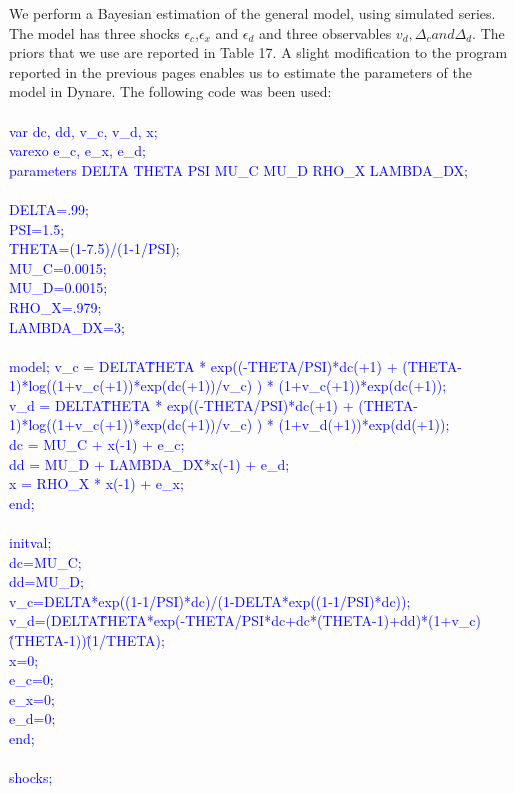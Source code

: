 \documentclass[a4paper,12pt]{scrartcl} %
\begin{document}
We perform a Bayesian estimation of the general model, using simulated series. The model has three shocks $\epsilon_c$,$\epsilon_x$ and $\epsilon_d$ and three observables $v_d, \Delta_c and \Delta_d$. The priors that we use are reported in Table 17. A slight modification to the program reported in the previous pages enables us to estimate the parameters of the model in Dynare. The following code was been used:\\
\\
\textcolor{blue}{
var  dc, dd, v\_c, v\_d, x;\\
varexo e\_c, e\_x, e\_d;
\\
parameters DELTA THETA PSI MU\_C MU\_D RHO\_X LAMBDA\_DX;\\
\\
DELTA=.99;\\
PSI=1.5;\\
THETA=(1-7.5)/(1-1/PSI);\\
MU\_C=0.0015;\\
MU\_D=0.0015;\\
RHO\_X=.979;\\
LAMBDA\_DX=3;\\
\\
model;
v\_c       = DELTA\^THETA * exp((-THETA/PSI)*dc(+1) + (THETA-1)*log((1+v\_c(+1))*exp(dc(+1))/v\_c) ) * (1+v\_c(+1))*exp(dc(+1));\\
v\_d       = DELTA\^THETA * exp((-THETA/PSI)*dc(+1) + (THETA-1)*log((1+v\_c(+1))*exp(dc(+1))/v\_c) ) * (1+v\_d(+1))*exp(dd(+1));\\
dc        = MU\_C  + x(-1) + e\_c;\\
dd        = MU\_D + LAMBDA\_DX*x(-1) + e\_d;\\
x         = RHO\_X * x(-1) + e\_x;\\
end;\\
\\
initval;\\
dc=MU\_C;\\
dd=MU\_D;\\
v\_c=DELTA*exp((1-1/PSI)*dc)/(1-DELTA*exp((1-1/PSI)*dc));\\
v\_d=(DELTA\^THETA*exp(-THETA/PSI*dc+dc*(THETA-1)+dd)*(1+v\_c)\^(THETA-1))\^(1/THETA);\\
x=0;\\
e\_c=0;\\
e\_x=0;\\
e\_d=0;\\
end;\\
\\
shocks;\\
}
\end{document}
